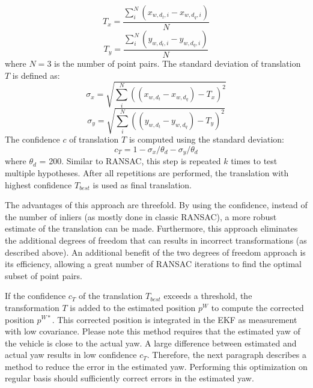 \begin{equation}
T_x = \frac{\sum_{i}^{N} (x_{w, d_t, i} - x_{w, d_q, i})}{N}
\end{equation}
\begin{equation}
T_y = \frac{\sum_{i}^{N} (y_{w, d_t ,i} - y_{w, d_q, i})}{N}
\end{equation}
where $N = 3$ is the number of point pairs.
The standard deviation of translation  $T$ is defined as:
\begin{equation}
\sigma_x = \sqrt{  \sum_{i}^{N}   ((x_{w, d_t} - x_{w, d_q}) - T_x)^{2}   }
\end{equation}
\begin{equation}
\sigma_y = \sqrt{  \sum_{i}^{N}   ((y_{w, d_t} - y_{w, d_q}) - T_y)^{2}   }
\end{equation}
The confidence $c$ of translation $T$ is computed using the standard deviation:
\begin{equation}
c_{T} = 1 -   \sigma_x / \theta_{d} -  \sigma_y / \theta_{d}
\end{equation}
where $\theta_d$ = 200.
Similar to RANSAC, this step is repeated $k$ times to test multiple hypotheses.
After all repetitions are performed, the translation with highest confidence $T_{best}$ is used as final translation.

The advantages of this approach are threefold.
By using the confidence, instead of the number of inliers (as mostly done in classic RANSAC), a more robust estimate of the translation can be made. 
Furthermore, this approach eliminates the additional degrees of freedom that can results in incorrect transformations (as described above).
An additional benefit of the two degrees of freedom approach is its efficiency, allowing a great number of RANSAC iterations to find the optimal subset of point pairs.

If the confidence $c_{T}$ of the translation $T_{best}$ exceeds a threshold, the transformation $T$ is added to the estimated position $p^W$ to compute the corrected position $p^{W*}$. This corrected position is integrated in the EKF as measurement with low covariance.
Please note this method requires that the estimated yaw of the vehicle is close to the actual yaw.
A large difference between estimated and actual yaw results in low confidence $c_T$.
Therefore, the next paragraph describes a method to reduce the error in the estimated yaw.
Performing this optimization on regular basis should sufficiently correct errors in the estimated yaw.


